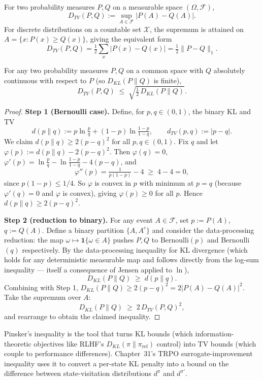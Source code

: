 \begin{definition}
\label{def:tv}
For two probability measures $P, Q$ on a measurable space $(\Omega, \mathcal{F})$,
\[
D_{TV}(P, Q) := \sup_{A \in \mathcal{F}} |P(A) - Q(A)|.
\]
For discrete distributions on a countable set $\mathcal{X}$, the supremum is attained on $A = \{x : P(x) \ge Q(x)\}$, giving the equivalent form
\[
D_{TV}(P, Q) = \tfrac{1}{2} \sum_{x} |P(x) - Q(x)| = \tfrac{1}{2}\|P - Q\|_1.
\]
\end{definition}

\begin{theorem}
\label{thm:pinsker}
For any two probability measures $P, Q$ on a common space with $Q$ absolutely continuous with respect to $P$ (so $D_{KL}(P \| Q)$ is finite),
\[
D_{TV}(P, Q) \;\le\; \sqrt{\tfrac{1}{2}\, D_{KL}(P \| Q)}.
\]
\end{theorem}

\begin{proof}
\textbf{Step 1 (Bernoulli case).} Define, for $p, q \in (0,1)$, the binary KL and TV
\[
  d(p \| q) := p \ln\tfrac{p}{q} + (1-p)\ln\tfrac{1-p}{1-q}, \qquad d_{TV}(p, q) := |p - q|.
\]
We claim $d(p \| q) \ge 2 (p-q)^2$ for all $p, q \in (0,1)$. Fix $q$ and let $\varphi(p) := d(p \| q) - 2(p - q)^2$. Then $\varphi(q) = 0$, $\varphi'(p) = \ln\tfrac{p}{q} - \ln\tfrac{1-p}{1-q} - 4(p-q)$, and
\[
  \varphi''(p) = \tfrac{1}{p(1-p)} - 4 \;\ge\; 4 - 4 = 0,
\]
since $p(1-p) \le 1/4$. So $\varphi$ is convex in $p$ with minimum at $p = q$ (because $\varphi'(q) = 0$ and $\varphi$ is convex), giving $\varphi(p) \ge 0$ for all $p$. Hence $d(p \| q) \ge 2 (p - q)^2$.

\textbf{Step 2 (reduction to binary).} For any event $A \in \mathcal{F}$, set $p := P(A)$, $q := Q(A)$. Define a binary partition $\{A, A^c\}$ and consider the data-processing reduction: the map $\omega \mapsto \mathbf{1}\{\omega \in A\}$ pushes $P, Q$ to Bernoulli$(p)$ and Bernoulli$(q)$ respectively. By the data-processing inequality for KL divergence (which holds for any deterministic measurable map and follows directly from the log-sum inequality --- itself a consequence of Jensen applied to $\ln$),
\[
  D_{KL}(P \| Q) \;\ge\; d(p \| q).
\]
Combining with Step 1, $D_{KL}(P \| Q) \ge 2(p - q)^2 = 2 |P(A) - Q(A)|^2$. Take the supremum over $A$:
\[
  D_{KL}(P \| Q) \;\ge\; 2 \, D_{TV}(P, Q)^2,
\]
and rearrange to obtain the claimed inequality.
\end{proof}

\begin{remark}
Pinsker's inequality is the tool that turns KL bounds (which information-theoretic objectives like RLHF's $D_{KL}(\pi \| \pi_{\mathrm{ref}})$ control) into TV bounds (which couple to performance differences). Chapter~31's TRPO surrogate-improvement inequality uses it to convert a per-state KL penalty into a bound on the difference between state-visitation distributions $d^\pi$ and $d^{\pi'}$.
\end{remark}


